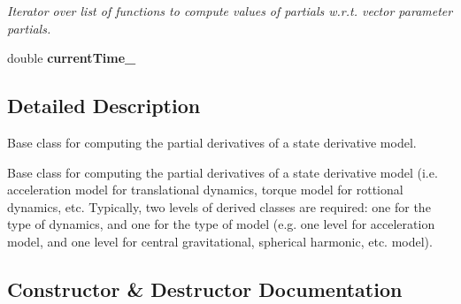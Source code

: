 \begin{DoxyCompactItemize}
\begin{DoxyCompactList}\small\item\em Iterator over list of functions to compute values of partials w.\+r.\+t. vector parameter partials. \end{DoxyCompactList}\item 
double {\bfseries current\+Time\+\_\+}\hypertarget{classtudat_1_1orbit__determination_1_1StateDerivativePartial_abbca0ac294a29b7d1efc16a68d7c4582}{}\label{classtudat_1_1orbit__determination_1_1StateDerivativePartial_abbca0ac294a29b7d1efc16a68d7c4582}

\end{DoxyCompactItemize}


\subsection{Detailed Description}
Base class for computing the partial derivatives of a state derivative model. 

Base class for computing the partial derivatives of a state derivative model (i.\+e. acceleration model for translational dynamics, torque model for rottional dynamics, etc. Typically, two levels of derived classes are required\+: one for the type of dynamics, and one for the type of model (e.\+g. one level for acceleration model, and one level for central gravitational, spherical harmonic, etc. model). 

\subsection{Constructor \& Destructor Documentation}

